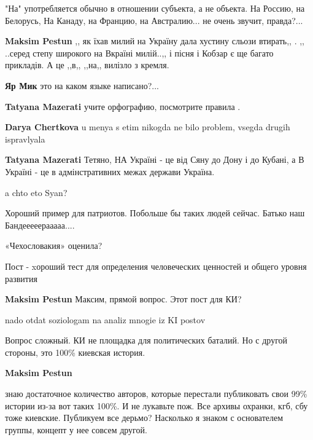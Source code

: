 \begin{itemize}
\begin{itemize}
\begin{itemize}
"На" употребляется обычно в отношении субъекта, а не объекта. На Россию, на Белорусь, На Канаду, на Францию, на Австралию... не очень звучит, правда?...

\textbf{Maksim Pestun} ,, як їхав милий на Україну дала хустину сльози втирать,, . ,, ..серед степу широкого на Вкраїні милій..,, і пісня і Кобзар є ще багато прикладів. А це ,,в,, ,,на,, вилізло з кремля.

\textbf{Яр Мик} это на каком языке написано?...
\end{itemize} %

\textbf{Tatyana Mazerati} учите орфографию, посмотрите правила .

\textbf{Darya Chertkova} u menya s etim nikogda ne bilo problem, vsegda drugih ispravlyala

\textbf{Tatyana Mazerati} Тетяно, НА Україні - це від Сяну до Дону і до Кубані, а В Україні - це в адмінстративних межах держави Україна.

a chto eto Syan?

\end{itemize} %

Хороший пример для патриотов. Побольше бы таких людей сейчас. Батько наш Бандееееерааааа....

«Чехословакия» оценила?


Пост - xороший тест для определения человеческих ценностей и общего уровня развития

\begin{itemize} %
\textbf{Maksim Pestun} Максим, прямой вопрос. Этот пост для КИ?

nado otdat soziologam na analiz mnogie iz KI postov

Вопрос сложный. КИ не площадка для политических баталий. Но с другой стороны, это 100\% киевская история.

\begin{itemize} %
\textbf{Maksim Pestun} 

знаю достаточное количество авторов, которые перестали публиковать свои 99\%
истории из-за вот таких 100\%. И не лукавьте пож. Все архивы охранки, кгб, сбу
тоже киевские. Публикуем все дерьмо? Насколько я знаком с основателем группы,
концепт у нее совсем другой.


\end{itemize}
\end{itemize}
\end{itemize}
